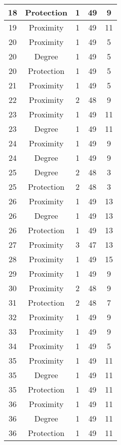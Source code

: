 \documentclass[results.tex]{subfiles}
\begin{document}
\begin{center}
\begin{tabular}{| c || c | c | c | c |}
    18 & Protection & 1 & 49 & 9 \\ 
    \hline
    19 & Proximity & 1 & 49 & 11 \\ 
    \hline
    20 & Proximity & 1 & 49 & 5 \\ 
    \hline
    20 & Degree & 1 & 49 & 5 \\ 
    \hline
    20 & Protection & 1 & 49 & 5 \\ 
    \hline
    21 & Proximity & 1 & 49 & 5 \\ 
    \hline
    22 & Proximity & 2 & 48 & 9 \\ 
    \hline
    23 & Proximity & 1 & 49 & 11 \\ 
    \hline
    23 & Degree & 1 & 49 & 11 \\ 
    \hline
    24 & Proximity & 1 & 49 & 9 \\ 
    \hline
    24 & Degree & 1 & 49 & 9 \\ 
    \hline
    25 & Degree & 2 & 48 & 3 \\ 
    \hline
    25 & Protection & 2 & 48 & 3 \\ 
    \hline
    26 & Proximity & 1 & 49 & 13 \\ 
    \hline
    26 & Degree & 1 & 49 & 13 \\ 
    \hline
    26 & Protection & 1 & 49 & 13 \\ 
    \hline
    27 & Proximity & 3 & 47 & 13 \\ 
    \hline
    28 & Proximity & 1 & 49 & 15 \\ 
    \hline
    29 & Proximity & 1 & 49 & 9 \\ 
    \hline
    30 & Proximity & 2 & 48 & 9 \\ 
    \hline
    31 & Protection & 2 & 48 & 7 \\ 
    \hline
    32 & Proximity & 1 & 49 & 9 \\ 
    \hline
    33 & Proximity & 1 & 49 & 9 \\ 
    \hline
    34 & Proximity & 1 & 49 & 5 \\ 
    \hline
    35 & Proximity & 1 & 49 & 11 \\ 
    \hline
    35 & Degree & 1 & 49 & 11 \\ 
    \hline
    35 & Protection & 1 & 49 & 11 \\ 
    \hline
    36 & Proximity & 1 & 49 & 11 \\ 
    \hline
    36 & Degree & 1 & 49 & 11 \\ 
    \hline
    36 & Protection & 1 & 49 & 11 \\ 
    \hline

\end{tabular}
\end{center}
\end{document}
